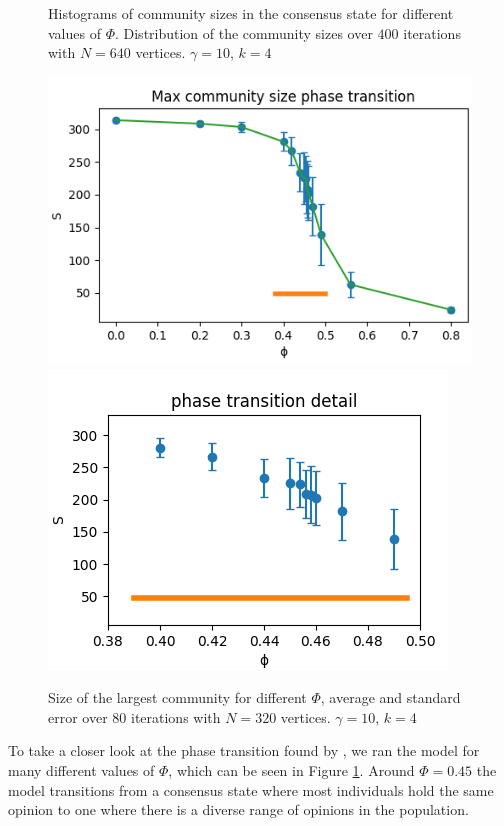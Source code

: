 \documentclass[11pt]{article}
\begin{document}
\begin{figure}[!htb]
  \caption{Histograms of community sizes in the consensus state for different values of $\Phi$.  Distribution of the community sizes over $400$ iterations with $N=640$ vertices. $\gamma=10$, $k=4$}
  \label{holme1_dist}
\endminipage\hfill
{}
\centering
  \includegraphics[width=\linewidth]{images/holme/maxS.png}
  \includegraphics[width=0.8\linewidth]{images/holme/maxSdetail.png}
  
  \caption{Size of the largest community for different $\Phi$, average and standard error over $80$ iterations with $N=320$ vertices. $\gamma=10$, $k=4$}
  \label{holme2_phase}
\endminipage\hfill

\end{figure}

To take a closer look at the phase transition found by  \citet{holme2006nonequilibrium}, we ran the model for many different values of $\Phi$, which can be seen in Figure \ref{holme2_phase}. Around $\Phi = 0.45$ the model transitions from a consensus state where most individuals hold the same opinion to one where there is a diverse range of opinions in the population. 
\FloatBarrier
\end{document}
